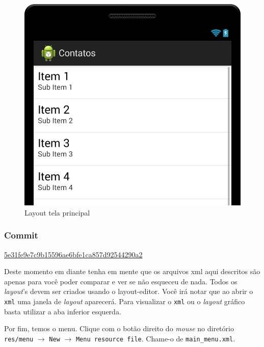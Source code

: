 \begin{figure}[h]
    \center
    \includegraphics[scale=0.3]{img/exemplo-pratico/activity_main-1.png}
    \caption{Layout tela principal}
    \label{fig:activity-main-1}
\end{figure}

\subsubsection{Commit}

\href{https://github.com/atilacamurca/guia-aberto-android-contatos/tree/5e31fe9e7c9b15596ae6bfe1ca857d92544290a2}{5e31fe9e7c9b15596ae6bfe1ca857d92544290a2}

Deste momento em diante tenha em mente que os arquivos \gls{xml} aqui
descritos são apenas para você poder comparar e ver se não esqueceu de
nada. Todos os \emph{layout}'s devem ser criados usando o
\gls{layout-editor}. Você irá notar que ao abrir o \texttt{xml} uma
janela de \emph{layout} aparecerá. Para visualizar o \texttt{xml} ou o
\emph{layout} gráfico basta utilizar a aba inferior esquerda.

Por fim, temos o menu. Clique com o botão direito do \emph{mouse} no
diretório \texttt{res/menu} $\rightarrow$ \texttt{New} $\rightarrow$
\texttt{Menu resource file}. Chame-o de \texttt{main\_menu.xml}.

\begin{listing}[H]
  \inputminted[linenos=true,frame=bottomline,tabsize=3]{ xml }{ source/main_menu-1.xml }
  \caption{Menu principal [res/menu/main\b{ }menu.xml]}
\end{listing}

